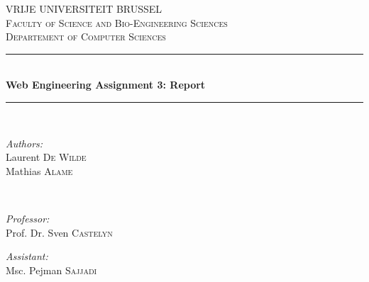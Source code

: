 \documentclass[11pt, a4paper,svglistings,oneside]{book}
\begin{document}
\begin{titlepage}

\newcommand{\HRule}{\rule{\linewidth}{0.5mm}}

\center


\textsc{\LARGE VRIJE UNIVERSITEIT BRUSSEL}\\[1.5cm] 
\textsc{\Large Faculty of Science and Bio-Engineering Sciences}\\[0.5cm] 
\textsc{\large Departement of Computer Sciences}\\[0.5cm] 


\HRule \\[0.7cm]
{ \huge \bfseries Web Engineering Assignment 3: Report}\\[0.4cm] 
\HRule \\[1.5cm]
 

\begin{minipage}{0.4\textwidth}
\begin{flushleft} \large
\emph{Authors:}\\
Laurent \textsc{De Wilde} \\
Mathias \textsc{Alame}
\end{flushleft}
\end{minipage}
~
\begin{minipage}{0.4\textwidth}
\begin{flushright} \large
\emph{Professor:} \\
Prof. Dr. Sven \textsc{Castelyn}

\emph{Assistant:} \\
Msc. Pejman \textsc{Sajjadi}
\end{flushright}
\end{minipage}\\[4cm]



\end{titlepage}
\end{document}
